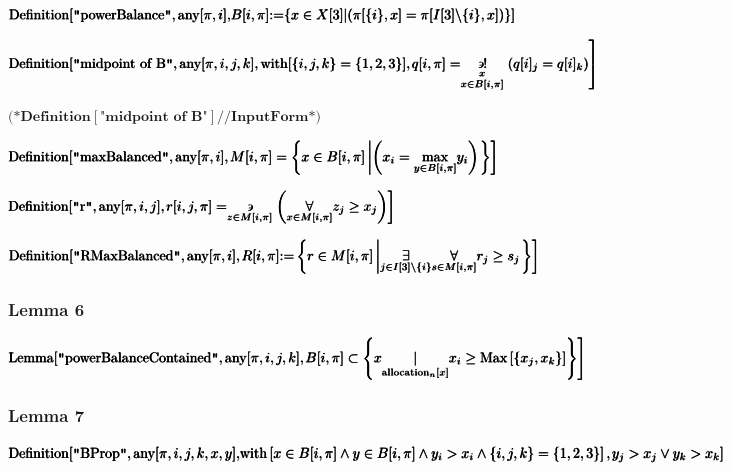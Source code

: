 \documentclass{article}
\begin{document}
\noindent\(\pmb{\text{Definition}[\text{$\texttt{"}$powerBalance$\texttt{"}$},\text{any}[\pi ,i],}\\
\pmb{B[i,\pi ]\text{:=}\{x\in X[3]|(\pi [\{i\},x]= \pi [I[3]\backslash \{i\},x])\}]}\)

\noindent\(\pmb{\text{Definition}[\text{$\texttt{"}$midpoint of B$\texttt{"}$},\text{any}[\pi ,i,j,k],\text{with}[\{i,j,k\}=\{1,2,3\}],}\\
\pmb{\left.q[i,\pi ] = \underset{x\in B[i,\pi ]}{\underset{x}{\backepsilon !}}\left(q[i]_j=q[i]_k\right)\right]}\)

\noindent\(\pmb{\text{(*}\text{Definition}[\text{$\texttt{"}$midpoint of B$\texttt{"}$}]\text{//}\text{InputForm}\text{*)}}\)

\noindent\(\pmb{\text{Definition}[\text{$\texttt{"}$maxBalanced$\texttt{"}$},\text{any}[\pi ,i],}\\
\pmb{\left.M[i,\pi ]=\left\{x\in B[i,\pi ]\left|\left(x_i= \underset{y\in B[i,\pi ]}{\max }y_i\right)\right.\right\}\right]}\)

\noindent\(\pmb{\text{Definition}[\text{$\texttt{"}$r$\texttt{"}$},\text{any}[\pi ,i,j],}\\
\pmb{\left.r[i,j,\pi ]=\underset{z\in M[i,\pi ]}{\backepsilon }\left(\underset{x\in M[i,\pi ]}{\forall }z_j\geq  x_j\right)\right]}\)

\noindent\(\pmb{\text{Definition}[\text{$\texttt{"}$RMaxBalanced$\texttt{"}$},\text{any}[\pi ,i],}\\
\pmb{\left.R[i,\pi ]\text{:=}\left\{r\in M[i,\pi ]\left| \underset{j\in I[3]\backslash \{i\}}{\exists }\underset{s\in M[i,\pi ]}{\forall }r_j\geq
s_j\right.\right\}\right]}\)

\subsubsection*{Lemma 6}

\noindent\(\pmb{\text{Lemma}[\text{$\texttt{"}$powerBalanceContained$\texttt{"}$},\text{any}[\pi ,i,j,k],}\\
\pmb{\left.B[i,\pi ]\subset  \left\{x\underset{\text{allocation}_n[x]}{|}x_i\geq  \text{Max}\left[\left\{x_j,x_k\right\}\right]\right\}\right]}\)

\subsubsection*{Lemma 7}

\noindent\(\pmb{\text{Definition}[\text{$\texttt{"}$BProp$\texttt{"}$},\text{any}[\pi ,i,j,k,x,y], }\\
\pmb{\text{with}\left[x\in B[i,\pi ]\land y\in B[i,\pi ] \land  y_i>x_i\land \{i,j,k\}=\{1,2,3\}\right],}\\
\pmb{\left.y_j>x_j\lor y_k>x_k\right]}\)
\end{document}
